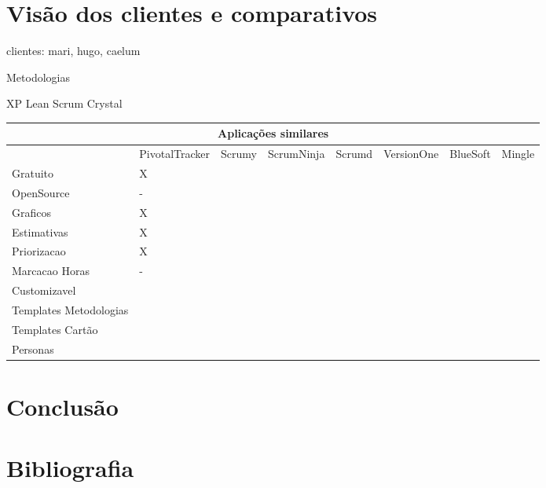 \documentclass[titlepage,a4paper]{article}
\begin{document}
\section{Visão dos clientes e comparativos}

clientes: mari, hugo, caelum

Metodologias

XP
Lean
Scrum
Crystal


\begin{sidewaystable}
	\begin{tabular}{|l|l|l|l|l|l|l|l}
		\hline
		\multicolumn{8}{|c|}{Aplicações similares} \\
		\hline
		 & PivotalTracker & Scrumy & ScrumNinja & Scrumd & VersionOne & BlueSoft & Mingle \\
		Gratuito & X & & & & & & \\
		OpenSource & - & & & & & & \\
		Graficos & X & & & & & & \\
		Estimativas & X & & & & & & \\
		Priorizacao & X & & & & & & \\
		Marcacao Horas & - & & & & & & \\
		Customizavel & & & & & & & \\
		Templates Metodologias & & & & & & & \\
		Templates Cartão & & & & & & & \\
		Personas & & & & & & & \\
		\hline
	\end{tabular}
\end{sidewaystable}

\section{Conclusão}

\section{Bibliografia}
\end{document}
